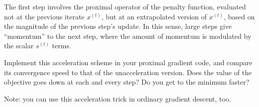 \documentclass{article}
\begin{document}
\begin{enumerate}[label=(\Alph*)]
The first step involves the proximal operator of the penalty function, evaluated not at the previous iterate $x^{(t)}$, but at an extrapolated version of $x^{(t)}$, based on the magnitude of the previous step's update.  In this sense, large steps give ``momentum'' to the next step, where the amount of momentum is modulated by the scalar $s^{(t)}$ terms.

Implement this acceleration scheme in your proximal gradient code, and compare its convergence speed to that of the unacceleration version.  Does the value of the objective goes down at each and every step?  Do you get to the minimum faster?

Note: you can use this acceleration trick in ordinary gradient descent, too.

\end{enumerate}
\end{document}
